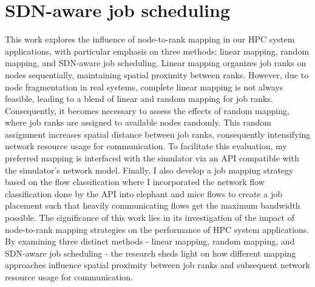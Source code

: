 \section{SDN-aware job scheduling}
This work explores the influence of node-to-rank mapping in our HPC system applications, with particular emphasis on three methods: linear mapping, random mapping, and SDN-aware job scheduling. Linear mapping organizes job ranks on nodes sequentially, maintaining spatial proximity between ranks. However, due to node fragmentation in real systems, complete linear mapping is not always feasible, leading to a blend of linear and random mapping for job ranks. Consequently, it becomes necessary to assess the effects of random mapping, where job ranks are assigned to available nodes randomly. This random assignment increases spatial distance between job ranks, consequently intensifying network resource usage for communication. To facilitate this evaluation, my preferred mapping is interfaced with the simulator via an API compatible with the simulator's network model. Finally, I also develop a job mapping strategy based on the 
flow classification where I incorporated the network flow classification done by the API into elephant and mice flows to create a job placement such that heavily communicating flows get the maximum bandwidth possible. The significance of this work lies in its investigation of the impact of node-to-rank mapping strategies on the performance of HPC system applications. By examining three distinct methods - linear mapping, random mapping, and SDN-aware job scheduling - the research sheds light on how different mapping approaches influence spatial proximity between job ranks and subsequent network resource usage for communication.
